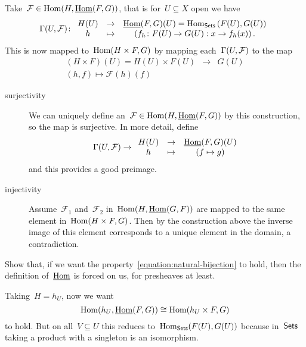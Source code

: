 \documentclass[a4paper,11pt,oneside,openany,article]{memoir}
\begin{document}
\begin{enumerate}
    \begin{solution}
      Take~$\mathcal{F}\in\operatorname{Hom}(H,\underline{\operatorname{Hom}}(F,G))$, that is for~$U\subseteq X$ open we have
      \begin{equation}
        \mathrm{\Gamma}(U,\mathcal{F})\colon
        \begin{array}{ccc}
          H(U)&\to &\underline{\operatorname{Hom}}(F,G)(U)=\operatorname{Hom}_{\mathsf{Sets}}\left( F(U),G(U) \right) \\
          h&\mapsto & \left( f_h\colon F(U)\to G(U):x\to f_h(x) \right).
        \end{array}
      \end{equation}
      This is now mapped to~$\operatorname{Hom}(H\times F,G)$ by mapping each~$\mathrm{\Gamma}(U,\mathcal{F})$ to the map
      \begin{equation}
        \begin{array}{ccc}
          \left( H\times F \right)(U)=H(U)\times F(U)&\to&G(U) \\
          (h,f)\mapsto\mathcal{F}(h)(f)
        \end{array}
      \end{equation}

      \begin{description}
        \item[surjectivity] We can uniquely define an~$\mathcal{F}\in\operatorname{Hom}(H,\underline{\operatorname{Hom}}(F,G))$ by this construction, so the map is surjective. In more detail, define
          \begin{equation}
            \mathrm{\Gamma}(U,\mathcal{F})\to
            \begin{array}{ccc}
              H(U)&\to&\underline{\operatorname{Hom}}(F,G)(U) \\
              h&\mapsto& \left( f\mapsto g \right)
            \end{array}
          \end{equation}
          and this provides a good preimage.
        \item[injectivity] Assume~$\mathcal{F}_1$ and~$\mathcal{F}_2$ in~$\operatorname{Hom}(H,\underline{\operatorname{Hom}}(G,F))$ are mapped to the same element in~$\operatorname{Hom}(H\times F,G)$. Then by the construction above the inverse image of this element corresponds to a unique element in the domain, a contradiction.
      \end{description}
    \end{solution}

    Show that, if we want the property~\eqref{equation:natural-bijection} to hold, then the definition of~$\underline{\operatorname{Hom}}$ is forced on us, for presheaves at least.

    \begin{solution}
      Taking~$H=h_U$, now we want
      \begin{equation}
        \operatorname{Hom}(h_U,\underline{\operatorname{Hom}}(F,G))\cong\operatorname{Hom}(h_U\times F,G)
      \end{equation}
      to hold. But on all~$V\subseteq U$ this reduces to~$\operatorname{Hom}_{\mathsf{Sets}}(F(U),G(U))$ because in~$\mathsf{Sets}$ taking a product with a singleton is an isomorphism.
    \end{solution}


\end{enumerate}
\end{document}
